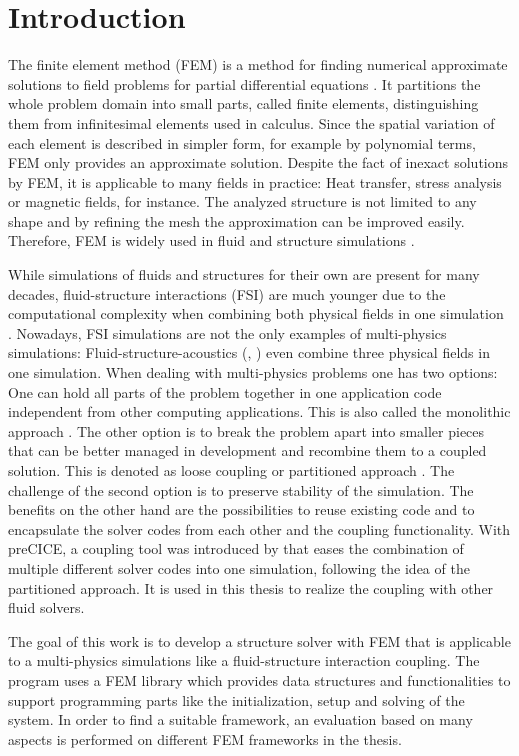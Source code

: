 \section{Introduction}
The finite element method (FEM) is a method for finding numerical approximate solutions to field problems for partial differential equations \cite{cook2002concepts}. It partitions the whole problem domain into small parts, called finite elements, distinguishing them from infinitesimal elements used in calculus. Since the spatial variation of each element is described in simpler form, for example by polynomial terms, FEM only provides an approximate solution. Despite the fact of inexact solutions by FEM, it is applicable to many fields in practice: Heat transfer, stress analysis or magnetic fields, for instance. The analyzed structure is not limited to any shape and by refining the mesh the approximation can be improved easily. Therefore, FEM is widely used in fluid and structure simulations \cite{cook2002concepts}.

While simulations of fluids and structures for their own are present for many decades, fluid-structure interactions (FSI) are much younger due to the computational complexity when combining both physical fields in one simulation \cite{gatzhammer2015efficient}. Nowadays, FSI simulations are not the only examples of multi-physics simulations: Fluid-structure-acoustics (\cite{link20092d}, \cite{schafer2010fluid}) even combine three physical fields in one simulation. When dealing with multi-physics problems one has two options: One can hold all parts of the problem together in one application code independent from other computing applications. This is also called the monolithic approach \cite{gatzhammer2015efficient}. The other option is to break the problem apart into smaller pieces that can be better managed in development and recombine them to a coupled solution. This is denoted as loose coupling or partitioned approach \cite{lohner2006extending}. The challenge of the second option is to preserve stability of the simulation. The benefits on the other hand are the possibilities to reuse existing code and to encapsulate the solver codes from each other and the coupling functionality. With preCICE, a coupling tool was introduced by \cite{gatzhammer2015efficient} that eases the combination of multiple different solver codes into one simulation, following the idea of the partitioned approach. It is used in this thesis to realize the coupling with other fluid solvers.

The goal of this work is to develop a structure solver with FEM that is applicable to a multi-physics simulations like a fluid-structure interaction coupling. The program uses a FEM library which provides data structures and functionalities to support programming parts like the initialization, setup and solving of the system. In order to find a suitable framework, an evaluation based on many aspects is performed on different FEM frameworks in the thesis.

